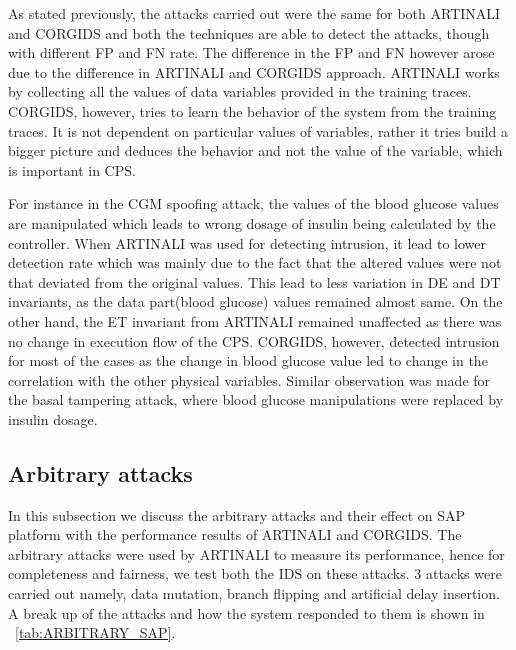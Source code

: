 As stated previously, the attacks carried out were the same for both ARTINALI and CORGIDS and both the techniques are able to detect the attacks, though with different FP and FN rate. The difference in the FP and FN however arose due to the difference in ARTINALI and CORGIDS approach. ARTINALI works by collecting all the values of data variables provided in the training traces. CORGIDS, however, tries to learn the behavior of the system from the training traces. It is not dependent on particular values of variables, rather it tries build a bigger picture and deduces the behavior and not the value of the variable, which is important in CPS. 

For instance in the CGM spoofing attack, the values of the blood glucose values are manipulated which leads to wrong dosage of insulin being calculated by the controller. When ARTINALI was used for detecting intrusion, it lead to lower detection rate which was mainly due to the fact that the altered values were not that deviated from the original values. This lead to less variation in D\textbar E and D\textbar T invariants, as the data part(blood glucose) values remained almost same. On the other hand, the E\textbar T invariant from ARTINALI remained unaffected as there was no change in execution flow of the CPS. CORGIDS, however, detected intrusion for most of the cases as the change in blood glucose value led to change in the correlation with the other physical variables. Similar observation was made for the basal tampering attack, where blood glucose manipulations were replaced by insulin dosage.


\subsection{Arbitrary attacks}
In this subsection we discuss the arbitrary attacks and their effect on SAP platform with the performance results of ARTINALI and CORGIDS. The arbitrary attacks were used by ARTINALI to measure its performance, hence for completeness and fairness, we test both the IDS on these attacks. 3 attacks were carried out namely, data mutation, branch flipping and artificial delay insertion. A break up of the attacks and how the system responded to them is shown in ~\autoref{tab:ARBITRARY_SAP}.

\begin{table}
\centering
  \caption{Arbitrary attacks on SAP platform and its response}
  \label{tab:ARBITRARY_SAP}
\end{table}

